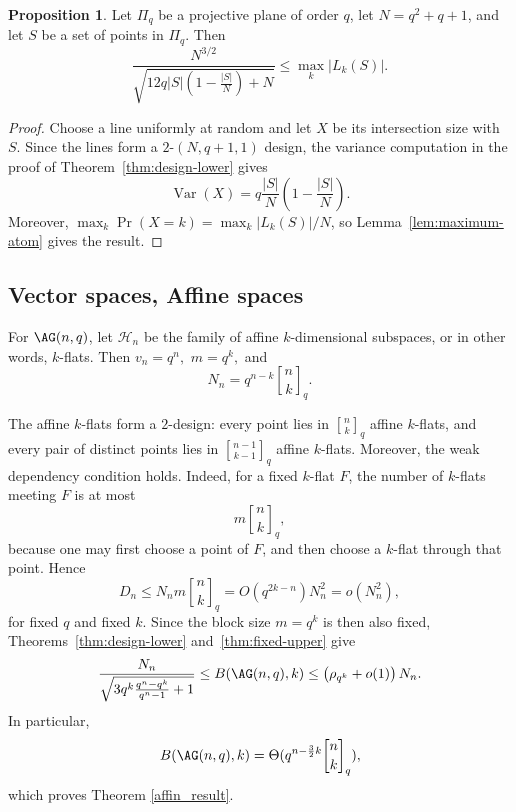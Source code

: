 \documentclass[10pt]{article}
\theoremstyle{definition}
\newtheorem{proposition}[thm]{Proposition}
\begin{document}
	\begin{proposition}\label{prop:projective-lower}
		{Let \(\Pi_q\) be a projective plane of order \(q\), let \(N=q^2+q+1\), and let \(S\) be a set of points in \(\Pi_q\). Then}
		\[
		{\ensuremath{\frac{N^{3/2}}
				{\sqrt{12q|S|\left(1-\frac{|S|}{N}\right)+N}}
				\leq\max_k|L_k(S)|.}}
		\]
	\end{proposition}
	
	\begin{proof}
		{Choose a line uniformly at random and let \(X\) be its intersection size with \(S\). Since the lines form a \(2\text{-}(N,q+1,1)\) design, the variance computation in the proof of Theorem~\ref{thm:design-lower} gives}
		\[
		{\ensuremath{\operatorname{Var}(X)
				=q\frac{|S|}{N}\left(1-\frac{|S|}{N}\right).}}
		\]
		{Moreover, \(\max_k\Pr(X=k)=\max_k|L_k(S)|/N\), so Lemma~\ref{lem:maximum-atom} gives the result.}
	\end{proof}
	
	
	\subsection{Vector spaces, Affine spaces}
	For $\AG(n,q)$, let \(\mathcal H_n\) be the family of affine $k$-dimensional subspaces, or in other words, 
	\(k\)-flats.  Then
	$        v_n=q^n,  $   $  m=q^k,$
	and
	\[
	N_n
	=
	q^{n-k}{n\brack k}_q.
	\]
	
	The affine \(k\)-flats form a \(2\)-design: every point lies in
	\({n\brack k}_q\) affine \(k\)-flats, and every pair of distinct points
	lies in \({n-1\brack k-1}_q\) affine \(k\)-flats.  Moreover, the weak
	dependency condition holds.  Indeed, for a fixed \(k\)-flat \(F\), the
	number of \(k\)-flats meeting \(F\) is at most
	\[
	m{n\brack k}_q,
	\]
	because one may first choose a point of \(F\), and then choose a
	\(k\)-flat through that point.  Hence
	\[
	D_n
	\leq
	N_n m{n\brack k}_q
	=
	O(q^{2k-n})N_n^2
	=
	o(N_n^2),
	\]
	for fixed \(q\) and fixed \(k\). Since the block size \(m=q^k\) is then also
	fixed, 
	Theorems~\ref{thm:design-lower} and~\ref{thm:fixed-upper} give
	\[
	\frac{N_n}
	{\sqrt{3q^k\frac{q^n-q^k}{q^n-1}+1}}
	\leq
	B(\AG(n,q),k)
	\leq
	\left(\rho_{q^k}+o(1)\right)N_n.
	\]
	In particular,
	\[
	B(\AG(n,q),k)
	=
	\Theta(     q^{n-\frac{3}{2}k}{n\brack k}_q), 
	\]
	which proves Theorem \ref{affin_result}.
	
\end{document}
